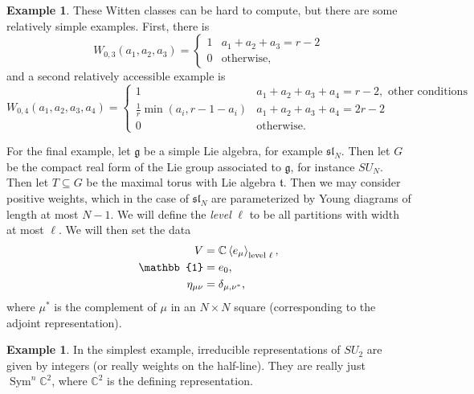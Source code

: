 \documentclass[leqno, openany]{memoir}
\theoremstyle{definition}
\newtheorem{exm}[thm]{Example}
\theoremstyle{remark}
\theoremstyle{plain}
\theoremstyle{definition}
\theoremstyle{remark}
\newcommand{\C}{\mathbb{C}}
\newcommand{\g}{\mathfrak{g}}
\newcommand{\mf}[1]{\mathfrak{#1}}
\newcommand{\on}[1]{\operatorname{#1}}
\begin{document}
\begin{exm}
  These Witten classes can be hard to compute, but there are some relatively simple examples. First, there is
  \[ W_{0,3}(a_1,a_2,a_3) = \begin{cases}
                               1 & a_1 + a_2 + a_3 = r-2 \\
                               0 & \text{otherwise},
                             \end{cases} \]
  and a second relatively accessible example is
  \[ W_{0,4}(a_1, a_2, a_3,a_4) = \begin{cases}
                                    1 & a_1+a_2+a_3+a_4 = r-2, \text{ other conditions} \\
                                    \frac{1}{r} \min(a_i,r-1-a_i) & a_1+a_2+a_3 + a_4 = 2r-2 \\
                                    0 & \text{otherwise}.
                                  \end{cases} \]
\end{exm}

For the final example, let $\g$ be a simple Lie algebra, for example $\mf{sl}_N$. Then let $G$ be the compact real form of the Lie group associated to $\g$, for instance $SU_N$. Then let $T \subseteq G$ be the maximal torus with Lie algebra $\mf{t}$. Then we may consider positive weights, which in the case of $\mf{sl}_N$ are parameterized by Young diagrams of length at most $N-1$. We will define the \textit{level} $\ell$ to be all partitions with width at most $\ell$. We will then set the data
\begin{align*}
  V &= \C \ev{e_{\mu}}_{\text{level } \ell}, \\
  \mathbb{1} &= e_0, \\
  \eta_{\mu\nu} &= \delta_{\mu,\nu^*},
\end{align*}
where $\mu^*$ is the complement of $\mu$ in an $N \times N$ square (corresponding to the adjoint representation).

\begin{exm}
In the simplest example, irreducible representations of $SU_2$ are given by integers (or really weights on the half-line). They are really just $\on{Sym}^n \C^2$, where $\C^2$ is the defining representation.
\end{exm}
\end{document}

